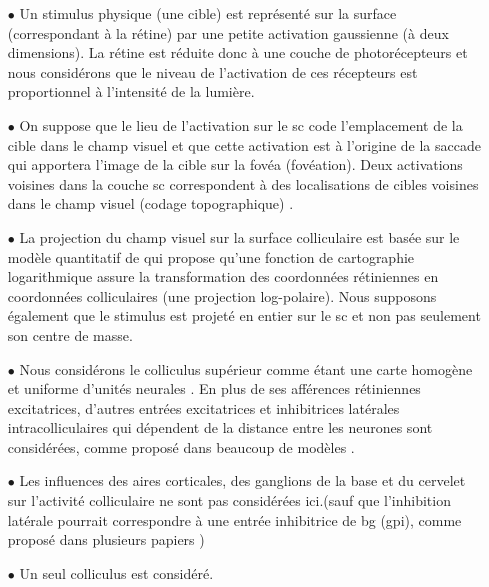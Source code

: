 \begin{itemize}

\item[$\bullet$] Un stimulus physique (une cible) est représenté sur la surface (correspondant à la rétine) par une petite activation gaussienne (à deux dimensions). La rétine est réduite donc à une couche de photorécepteurs et nous considérons que le niveau de l'activation de ces récepteurs est proportionnel à l'intensité de la lumière.\\

\item[$\bullet$] On suppose que le lieu de l'activation sur le \gls{sc} code l'emplacement de la cible dans le champ visuel et que cette activation est à l'origine de la saccade qui apportera l'image de la cible sur la fovéa (fovéation). Deux activations voisines dans la couche \gls{sc} correspondent à des localisations de cibles voisines dans le champ visuel (codage topographique) \cite{Schiller:1972, Wurtz:1972}.\\

\item[$\bullet$] La projection du champ visuel sur la surface colliculaire est basée sur le modèle quantitatif de \cite{Ottes:1986} qui propose qu'une fonction de cartographie logarithmique assure la transformation des coordonnées rétiniennes en coordonnées colliculaires (une projection log-polaire). Nous supposons également que le stimulus est projeté en entier sur le \gls{sc} et non pas seulement son centre de masse.\\

\item[$\bullet$] Nous considérons le colliculus supérieur comme étant une carte homogène et uniforme d'unités neurales \cite{Trappenberg:2001,Droulez:1991}. En plus de ses afférences rétiniennes excitatrices, d'autres entrées excitatrices et inhibitrices latérales intracolliculaires qui dépendent de la distance entre les neurones sont considérées, comme proposé dans beaucoup de modèles \cite{Arai:1994, Droulez:1991, Gancarz:1999, Lefevre:1992, Optican:1995, Short:2001, Trappenberg:2001, Nakahara:2006}.\\

\item[$\bullet$] Les influences des aires corticales, des ganglions de la base et du cervelet sur l'activité colliculaire ne sont pas considérées ici.(sauf que l'inhibition latérale pourrait correspondre à une entrée inhibitrice de \gls{bg} (\gls{gpi}), comme proposé dans plusieurs papiers \cite{Trappenberg:2001})\\

\item[$\bullet$] Un seul colliculus est considéré.\\
\end{itemize}
